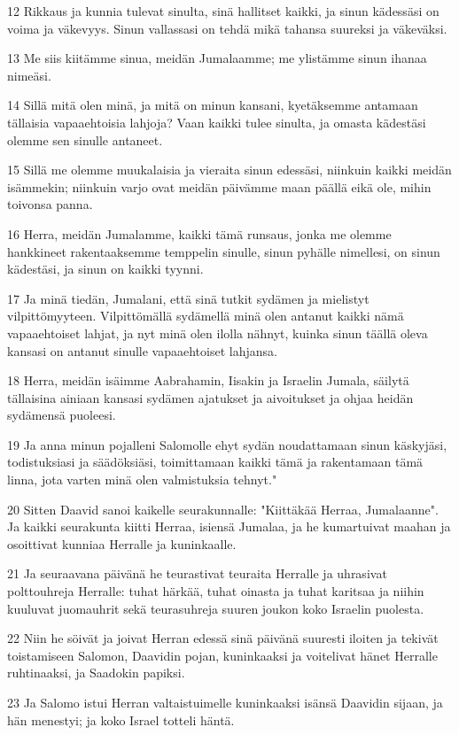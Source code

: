 \par 12 Rikkaus ja kunnia tulevat sinulta, sinä hallitset kaikki, ja sinun kädessäsi on voima ja väkevyys. Sinun vallassasi on tehdä mikä tahansa suureksi ja väkeväksi.
\par 13 Me siis kiitämme sinua, meidän Jumalaamme; me ylistämme sinun ihanaa nimeäsi.
\par 14 Sillä mitä olen minä, ja mitä on minun kansani, kyetäksemme antamaan tällaisia vapaaehtoisia lahjoja? Vaan kaikki tulee sinulta, ja omasta kädestäsi olemme sen sinulle antaneet.
\par 15 Sillä me olemme muukalaisia ja vieraita sinun edessäsi, niinkuin kaikki meidän isämmekin; niinkuin varjo ovat meidän päivämme maan päällä eikä ole, mihin toivonsa panna.
\par 16 Herra, meidän Jumalamme, kaikki tämä runsaus, jonka me olemme hankkineet rakentaaksemme temppelin sinulle, sinun pyhälle nimellesi, on sinun kädestäsi, ja sinun on kaikki tyynni.
\par 17 Ja minä tiedän, Jumalani, että sinä tutkit sydämen ja mielistyt vilpittömyyteen. Vilpittömällä sydämellä minä olen antanut kaikki nämä vapaaehtoiset lahjat, ja nyt minä olen ilolla nähnyt, kuinka sinun täällä oleva kansasi on antanut sinulle vapaaehtoiset lahjansa.
\par 18 Herra, meidän isäimme Aabrahamin, Iisakin ja Israelin Jumala, säilytä tällaisina ainiaan kansasi sydämen ajatukset ja aivoitukset ja ohjaa heidän sydämensä puoleesi.
\par 19 Ja anna minun pojalleni Salomolle ehyt sydän noudattamaan sinun käskyjäsi, todistuksiasi ja säädöksiäsi, toimittamaan kaikki tämä ja rakentamaan tämä linna, jota varten minä olen valmistuksia tehnyt."
\par 20 Sitten Daavid sanoi kaikelle seurakunnalle: "Kiittäkää Herraa, Jumalaanne". Ja kaikki seurakunta kiitti Herraa, isiensä Jumalaa, ja he kumartuivat maahan ja osoittivat kunniaa Herralle ja kuninkaalle.
\par 21 Ja seuraavana päivänä he teurastivat teuraita Herralle ja uhrasivat polttouhreja Herralle: tuhat härkää, tuhat oinasta ja tuhat karitsaa ja niihin kuuluvat juomauhrit sekä teurasuhreja suuren joukon koko Israelin puolesta.
\par 22 Niin he söivät ja joivat Herran edessä sinä päivänä suuresti iloiten ja tekivät toistamiseen Salomon, Daavidin pojan, kuninkaaksi ja voitelivat hänet Herralle ruhtinaaksi, ja Saadokin papiksi.
\par 23 Ja Salomo istui Herran valtaistuimelle kuninkaaksi isänsä Daavidin sijaan, ja hän menestyi; ja koko Israel totteli häntä.
